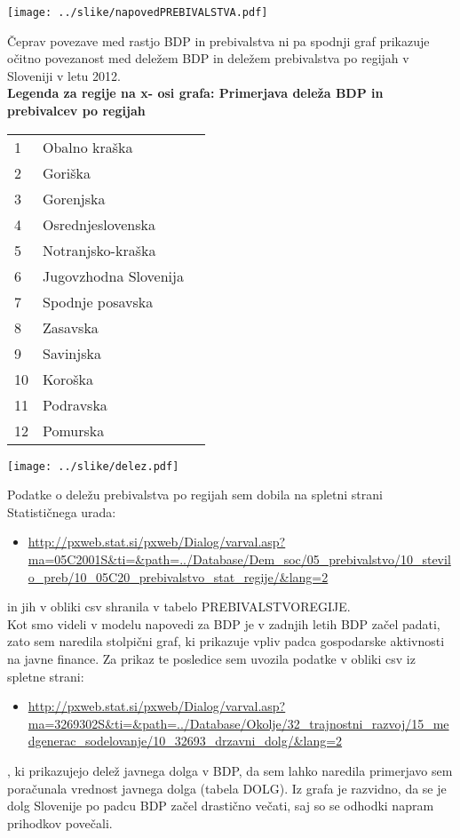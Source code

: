 \documentclass[a4paper, 11pt]{article}
\begin{document}
\newpage
\begin{center}
\texttt{[image: ../slike/napovedPREBIVALSTVA.pdf]}
\end{center} 

Čeprav povezave med rastjo BDP in prebivalstva ni pa spodnji graf prikazuje očitno povezanost med deležem BDP in deležem prebivalstva po regijah v Sloveniji v letu 2012. \\
\newpage
\textbf{Legenda za regije na x- osi grafa: Primerjava deleža BDP in prebivalcev po regijah}
\begin{table}[h]
\begin{tabular}{lll}
1 & Obalno kraška \\
2 & Goriška \\
3 & Gorenjska \\
4 & Osrednjeslovenska \\
5 & Notranjsko-kraška \\
6 & Jugovzhodna Slovenija\\
7 & Spodnje posavska\\
8 & Zasavska\\
9 & Savinjska \\
10 & Koroška \\
11 & Podravska\\
12 & Pomurska\\
\end{tabular}
\end{table}

\begin{center}
\texttt{[image: ../slike/delez.pdf]}
\end{center}
Podatke o deležu prebivalstva po regijah sem dobila na spletni strani Statističnega urada:
\begin{itemize}
\item{\url{http://pxweb.stat.si/pxweb/Dialog/varval.asp?ma=05C2001S&ti=&path=../Database/Dem_soc/05_prebivalstvo/10_stevilo_preb/10_05C20_prebivalstvo_stat_regije/&lang=2}} 
\end{itemize}
in jih v obliki csv shranila v tabelo PREBIVALSTVOREGIJE.\\

Kot smo videli v modelu napovedi za BDP je v zadnjih letih BDP začel padati, zato sem naredila stolpični graf, ki prikazuje vpliv padca gospodarske aktivnosti na javne finance.
Za prikaz te posledice sem uvozila podatke v obliki csv iz spletne strani:
\begin{itemize}
\item{\url{http://pxweb.stat.si/pxweb/Dialog/varval.asp?ma=3269302S&ti=&path=../Database/Okolje/32_trajnostni_razvoj/15_medgenerac_sodelovanje/10_32693_drzavni_dolg/&lang=2}}
\end{itemize}
, ki prikazujejo delež javnega dolga v BDP, da sem lahko naredila primerjavo sem poračunala vrednost javnega dolga (tabela DOLG).
Iz grafa je razvidno, da se je dolg Slovenije po padcu BDP začel drastično večati, saj so se odhodki napram prihodkov povečali.
\end{document}
